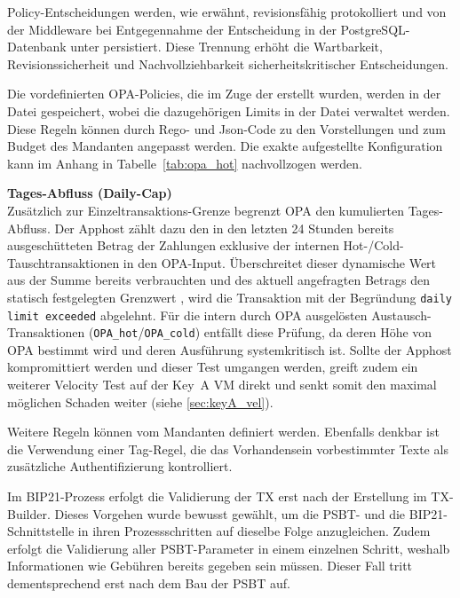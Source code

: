 Policy-Entscheidungen werden, wie erwähnt, revisionsfähig protokolliert und von der Middleware bei Entgegennahme der Entscheidung in der PostgreSQL-Datenbank unter  persistiert.
Diese Trennung erhöht die Wartbarkeit, Revisionssicherheit und Nachvollziehbarkeit sicherheitskritischer Entscheidungen.

Die vordefinierten \ac{OPA}-Policies, die im Zuge der  erstellt wurden, werden in der Datei  gespeichert, wobei die dazugehörigen Limits in der Datei  verwaltet werden. Diese Regeln können durch Rego- und Json-Code zu den Vorstellungen und zum Budget des Mandanten angepasst werden. Die exakte aufgestellte Konfiguration kann im Anhang in Tabelle~\ref{tab:opa_hot} nachvollzogen werden.

\textbf{Tages-Abfluss (Daily-Cap)} \label{sec:OPA_vel}\\
Zusätzlich zur Einzeltransaktions-Grenze begrenzt \ac{OPA} den kumulierten Tages-Abfluss. Der Apphost zählt dazu den in den letzten 24 Stunden bereits ausgeschütteten Betrag der Zahlungen exklusive der internen Hot-/Cold-Tauschtransaktionen in den \ac{OPA}-Input. Überschreitet dieser dynamische Wert aus der Summe bereits verbrauchten und des aktuell angefragten Betrags den statisch festgelegten Grenzwert \texttt{}, wird die Transaktion mit der Begründung \texttt{daily limit exceeded} abgelehnt. Für die intern durch \ac{OPA} ausgelösten Austausch-Transaktionen (\texttt{OPA\_hot}/\texttt{OPA\_cold}) entfällt diese Prüfung, da deren Höhe von OPA bestimmt wird und deren Ausführung systemkritisch ist.
Sollte der Apphost kompromittiert werden und dieser Test umgangen werden, greift zudem ein weiterer Velocity Test auf der Key~A VM direkt und senkt somit den maximal möglichen Schaden weiter (siehe \ref{sec:keyA_vel}).

Weitere Regeln können vom Mandanten definiert werden. Ebenfalls denkbar ist die Verwendung einer Tag-Regel, die das Vorhandensein vorbestimmter Texte als zusätzliche Authentifizierung kontrolliert.

Im \ac{BIP}21-Prozess erfolgt die Validierung der \ac{TX} erst nach der Erstellung im TX-Builder. Dieses Vorgehen wurde bewusst gewählt, um die \ac{PSBT}- und die \ac{BIP}21-Schnittstelle in ihren Prozessschritten auf dieselbe Folge anzugleichen. Zudem erfolgt die Validierung aller \ac{PSBT}-Parameter in einem einzelnen Schritt, weshalb Informationen wie Gebühren bereits gegeben sein müssen. Dieser Fall tritt dementsprechend erst nach dem Bau der \ac{PSBT} auf.

